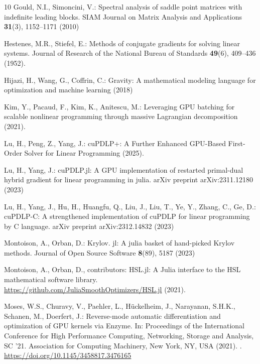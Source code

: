 \documentclass[smallextended]{svjour3}
\begin{document}
\begin{thebibliography}{10}
Gould, N.I., Simoncini, V.: Spectral analysis of saddle point matrices with indefinite leading blocks.
\newblock SIAM Journal on Matrix Analysis and Applications \textbf{31}(3), 1152--1171 (2010)

Hestenes, M.R., Stiefel, E.: Methods of conjugate gradients for solving linear systems.
\newblock Journal of Research of the National Bureau of Standards \textbf{49}(6), 409--436 (1952).
\newblock {}

Hijazi, H., Wang, G., Coffrin, C.: Gravity: A mathematical modeling language for optimization and machine learning  (2018)

Kim, Y., Pacaud, F., Kim, K., Anitescu, M.: Leveraging {{GPU}} batching for scalable nonlinear programming through massive {{Lagrangian}} decomposition (2021).
\newblock {}

Lu, H., Peng, Z., Yang, J.: {{cuPDLP}}+: {{A Further Enhanced GPU-Based First-Order Solver}} for {{Linear Programming}} (2025).
\newblock {}

Lu, H., Yang, J.: {cuPDLP.jl}: A {GPU} implementation of restarted primal-dual hybrid gradient for linear programming in julia.
\newblock arXiv preprint arXiv:2311.12180  (2023)

Lu, H., Yang, J., Hu, H., Huangfu, Q., Liu, J., Liu, T., Ye, Y., Zhang, C., Ge, D.: {cuPDLP-C}: A strengthened implementation of {cuPDLP} for linear programming by {C} language.
\newblock arXiv preprint arXiv:2312.14832  (2023)

Montoison, A., Orban, D.: Krylov. jl: A julia basket of hand-picked {K}rylov methods.
\newblock Journal of Open Source Software \textbf{8}(89), 5187 (2023)

Montoison, A., Orban, D., {contributors}: {HSL.jl}: A {J}ulia interface to the {HSL} mathematical software library.
\newblock \url{https://github.com/JuliaSmoothOptimizers/HSL.jl} (2021).
\newblock {}

Moses, W.S., Churavy, V., Paehler, L., H\"{u}ckelheim, J., Narayanan, S.H.K., Schanen, M., Doerfert, J.: Reverse-mode automatic differentiation and optimization of {GPU} kernels via {Enzyme}.
\newblock In: Proceedings of the International Conference for High Performance Computing, Networking, Storage and Analysis, SC '21. Association for Computing Machinery, New York, NY, USA (2021).
\newblock {}.
\newblock \urlprefix\url{https://doi.org/10.1145/3458817.3476165}


\end{thebibliography}
\end{document}

